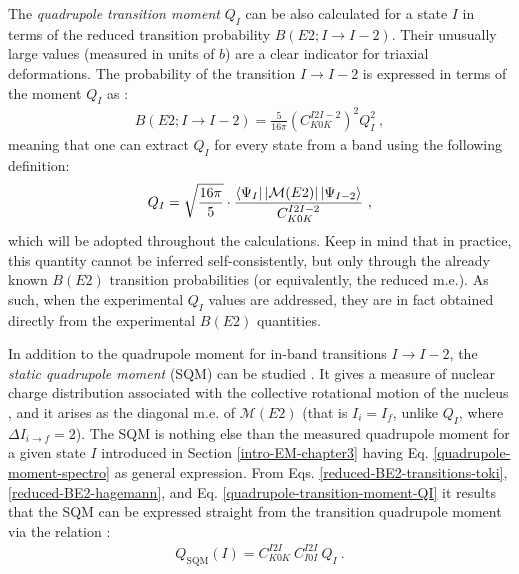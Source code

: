 The \emph{quadrupole transition moment} $Q_I$ can be also calculated for a state $I$ in terms of the reduced transition probability $B(E2; I\to I-2)$. Their unusually large values (measured in units of $b$) are a clear indicator for triaxial deformations. The probability of the transition $I\to I-2$ is expressed in terms of the moment $Q_I$ as \cite{hagemann1984signature}:
\begin{align}
    B(E2;I\to I-2)=\frac{5}{16\pi}(C_{K0K}^{I2I-2})^2Q_I^2\ , 
    \label{reduced-BE2-hagemann}
\end{align}
meaning that one can extract $Q_I$ for every state from a band using the following definition:
\begin{align}
    Q_I=\sqrt{\frac{16\pi}{5}}\cdot\frac{\bra{\Psi_{I}}|\mathcal{M}(E2)|\ket{\Psi_{I-2}}}{C_{K0K}^{I2I-2}}\ ,
    \label{quadrupole-transition-moment-QI}
\end{align}
which will be adopted throughout the calculations. Keep in mind that in practice, this quantity cannot be inferred self-consistently, but only through the already known $B(E2)$ transition probabilities (or equivalently, the reduced m.e.). As such, when the experimental $Q_I$ values are addressed, they are in fact obtained directly from the experimental $B(E2)$ quantities.

In addition to the quadrupole moment for in-band transitions $I \to I-2$, the \emph{static quadrupole moment} (SQM) can be studied \cite{bohr1998nuclear}. It gives a measure of nuclear charge distribution associated with the collective rotational motion of the nucleus \cite{chen2020g,chen2020static}, and it arises as the diagonal m.e. of $\mathcal{M}(E2)$ (that is $I_i=I_f$, unlike $Q_I$, where $\Delta I_{i\to f}=2$). The SQM is nothing else than the measured quadrupole moment for a given state $I$ introduced in Section \ref{intro-EM-chapter3} having Eq. \ref{quadrupole-moment-spectro} as general expression. From Eqs. \ref{reduced-BE2-transitions-toki}, \ref{reduced-BE2-hagemann}, and Eq. \ref{quadrupole-transition-moment-QI} it results that the SQM can be expressed straight from the transition quadrupole moment via the relation \cite{bohr1998nuclear}:
\begin{align}
    Q_\text{SQM}(I)=C_{K0K}^{I2I}\ C_{I0I}^{I2I}\ Q_I\ .
    \label{static-quadrupole-moment}
\end{align}

